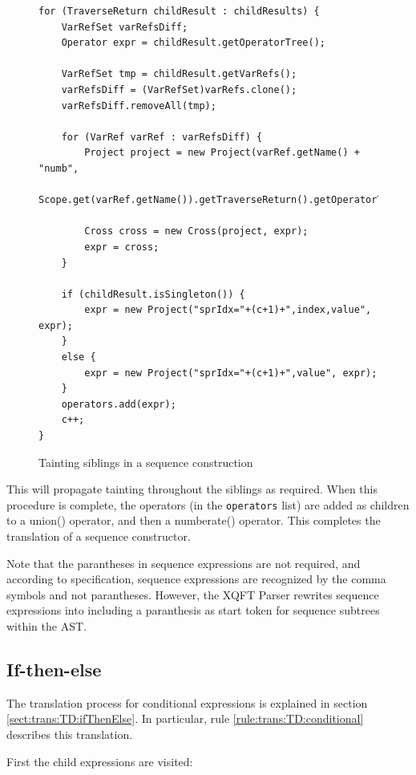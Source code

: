 \newpage
\begin{figure}[!htp]
\begin{center}
\lstset{language=Java,numbers=left}
\begin{lstlisting}
for (TraverseReturn childResult : childResults) {
    VarRefSet varRefsDiff;
    Operator expr = childResult.getOperatorTree();
    
    VarRefSet tmp = childResult.getVarRefs();
    varRefsDiff = (VarRefSet)varRefs.clone();
    varRefsDiff.removeAll(tmp);

    for (VarRef varRef : varRefsDiff) {
        Project project = new Project(varRef.getName() + "numb", 
                Scope.get(varRef.getName()).getTraverseReturn().getOperatorTree());
        
        Cross cross = new Cross(project, expr);
        expr = cross;
    }

    if (childResult.isSingleton()) {
        expr = new Project("sprIdx="+(c+1)+",index,value", expr);
    }
    else {
        expr = new Project("sprIdx="+(c+1)+",value", expr);
    }
    operators.add(expr);
    c++;
}
\end{lstlisting}
  \caption{Tainting siblings in a sequence construction}
  \label{fig:impl:td:seq_constr_tainting_siblings}
\end{center}
\end{figure}

This will propagate tainting throughout the siblings as required. When this
procedure is complete, the operators (in the \texttt{operators} list) are
added as children to a \textsf{union()} operator, and then a
\textsf{numberate()} operator. This completes the translation of a sequence
constructor.

Note that the parantheses in sequence expressions are not required, and
according to specification, sequence expressions are recognized by the comma
symbols and not parantheses. However, the XQFT Parser rewrites sequence
expressions into including a paranthesis as start token for sequence subtrees
within the AST.

\subsection{If-then-else}
The translation process for conditional expressions is explained in section
\ref{sect:trans:TD:ifThenElse}. In particular, rule
\ref{rule:trans:TD:conditional} describes this translation. 

First the child expressions are visited:

